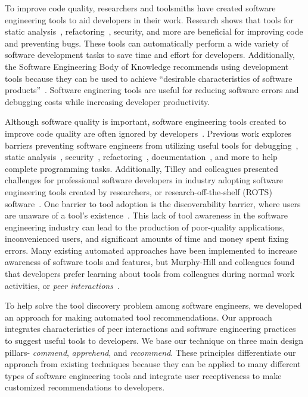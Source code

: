 \documentclass[sigconf,review,anonymous]{acmart}
\begin{document}
To improve code quality, researchers and toolsmiths have created software engineering tools to aid developers in their work. Research shows that tools for static analysis~\cite{UsingStaticAnalysis}, refactoring~\cite{Murphy-HillFitness}, security, and more are beneficial for improving code and preventing bugs. These tools can automatically perform a wide variety of software development tasks to save time and effort for developers. Additionally, the Software Engineering Body of Knowledge recommends using development tools because they can be used to achieve ``desirable characteristics of software products''~\cite{SWEBOK}. Software enginering tools are useful for reducing software errors and debugging costs while increasing developer productivity.

Although software quality is important, software engineering tools created to improve code quality are often ignored by developers~\cite{Ivanov2017Gaps}. Previous work explores barriers preventing software engineers from utilizing useful tools for debugging~\cite{CaoDebugging}, static analysis~\cite{Johnson2013Why}, security~\cite{Xiao2014Security}, refactoring~\cite{MurpyHillBarriersRefactoring}, documentation~\cite{ForwardDocumentationRelevance}, and more to help complete programming tasks. Additionally, Tilley and colleagues presented challenges for professional software developers in industry adopting software engineering tools created by researchers, or research-off-the-shelf (ROTS) software~\cite{Tilley2003ROTS}. One barrier to tool adoption is the discoverability barrier, where users are unaware of a tool's existence~\cite{Murphy-HillScreencastingDiscovery}. This lack of tool awareness in the software engineering industry can lead to the production of poor-quality applications, inconvenienced users, and significant amounts of time and money spent fixing errors. Many existing automated approaches have been implemented to increase awareness of software tools and features, but Murphy-Hill and colleagues found that developers prefer learning about tools from colleagues during normal work activities, or \textit{peer interactions}~\cite{MurphyHill2011PeerInteraction}.

To help solve the tool discovery problem among software engineers, we developed an approach for making automated tool recommendations. Our approach integrates characteristics of peer interactions and software engineering practices to suggest useful tools to developers. We base our technique on three main design pillars- \textit{commend}, \textit{apprehend}, and \textit{recommend}. These principles differentiate our approach from existing techniques because they can be applied to many different types of software engineering tools and integrate user receptiveness to make customized recommendations to developers. 
\end{document}

